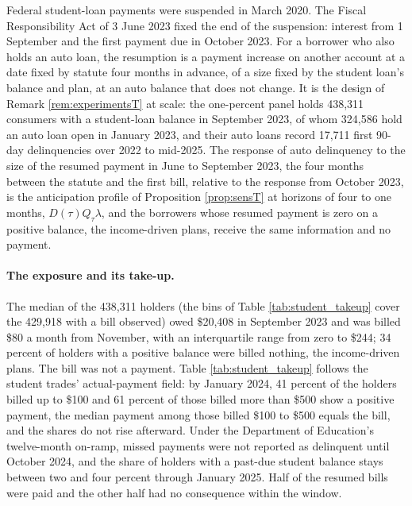 Federal student-loan payments were suspended in March 2020. The Fiscal Responsibility Act of 3 June 2023 fixed the end of the suspension: interest from 1 September and the first payment due in October 2023. For a borrower who also holds an auto loan, the resumption is a payment increase on another account at a date fixed by statute four months in advance, of a size fixed by the student loan's balance and plan, at an auto balance that does not change. It is the design of Remark \ref{rem:experimentsT} at scale: the one-percent panel holds 438,311 consumers with a student-loan balance in September 2023, of whom 324,586 hold an auto loan open in January 2023, and their auto loans record 17,711 first 90-day delinquencies over 2022 to mid-2025. The response of auto delinquency to the size of the resumed payment in June to September 2023, the four months between the statute and the first bill, relative to the response from October 2023, is the anticipation profile of Proposition \ref{prop:sensT} at horizons of four to one months, $D(\tau)Q_\tau\lambda$, and the borrowers whose resumed payment is zero on a positive balance, the income-driven plans, receive the same information and no payment.

\paragraph{The exposure and its take-up.} The median of the 438,311 holders (the bins of Table \ref{tab:student_takeup} cover the 429,918 with a bill observed) owed \$20,408 in September 2023 and was billed \$80 a month from November, with an interquartile range from zero to \$244; 34 percent of holders with a positive balance were billed nothing, the income-driven plans. The bill was not a payment. Table \ref{tab:student_takeup} follows the student trades' actual-payment field: by January 2024, 41 percent of the holders billed up to \$100 and 61 percent of those billed more than \$500 show a positive payment, the median payment among those billed \$100 to \$500 equals the bill, and the shares do not rise afterward. Under the Department of Education's twelve-month on-ramp, missed payments were not reported as delinquent until October 2024, and the share of holders with a past-due student balance stays between two and four percent through January 2025. Half of the resumed bills were paid and the other half had no consequence within the window.

